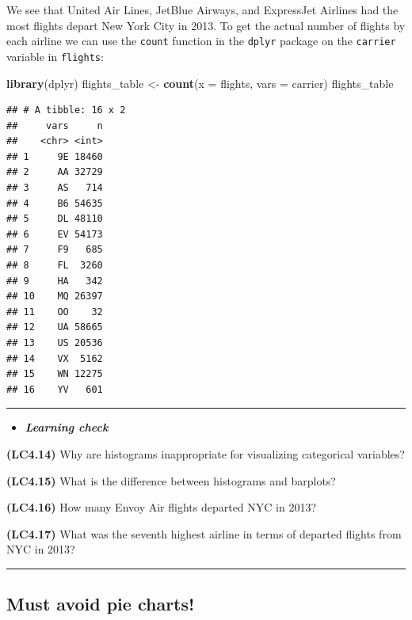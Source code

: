 \documentclass[]{tufte-book}
\newenvironment{Shaded}{\begin{snugshade}}{\end{snugshade}}
\newcommand{\KeywordTok}[1]{\textcolor[rgb]{0.13,0.29,0.53}{\textbf{{#1}}}}
\newcommand{\DataTypeTok}[1]{\textcolor[rgb]{0.13,0.29,0.53}{{#1}}}
\newcommand{\StringTok}[1]{\textcolor[rgb]{0.31,0.60,0.02}{{#1}}}
\newcommand{\NormalTok}[1]{{#1}}
\newenvironment{rmdblock}[1]
  {\begin{shaded*}
  \begin{itemize}
  \renewcommand{\labelitemi}{
    \raisebox{-.7\height}[0pt][0pt]{
    }
  }
  \item
  }
  {
  \end{itemize}
  \end{shaded*}
  }
\newenvironment{learncheck}
  {\begin{rmdblock}{warning}}
  {\end{rmdblock}}
\begin{document}
We see that United Air Lines, JetBlue Airways, and ExpressJet Airlines
had the most flights depart New York City in 2013. To get the actual
number of flights by each airline we can use the \texttt{count} function
in the \texttt{dplyr} package on the \texttt{carrier} variable in
\texttt{flights}:

\begin{Shaded}
\begin{Highlighting}[]
\KeywordTok{library}\NormalTok{(dplyr)}
\NormalTok{flights_table <-}\StringTok{ }\KeywordTok{count}\NormalTok{(}\DataTypeTok{x =} \NormalTok{flights, }\DataTypeTok{vars =} \NormalTok{carrier)}
\NormalTok{flights_table}
\end{Highlighting}
\end{Shaded}

\begin{verbatim}
## # A tibble: 16 x 2
##     vars     n
##    <chr> <int>
## 1     9E 18460
## 2     AA 32729
## 3     AS   714
## 4     B6 54635
## 5     DL 48110
## 6     EV 54173
## 7     F9   685
## 8     FL  3260
## 9     HA   342
## 10    MQ 26397
## 11    OO    32
## 12    UA 58665
## 13    US 20536
## 14    VX  5162
## 15    WN 12275
## 16    YV   601
\end{verbatim}

\begin{center}\rule{\linewidth}{\linethickness}\end{center}

\begin{learncheck}
\textbf{\emph{Learning check}}
\end{learncheck}

\textbf{(LC4.14)} Why are histograms inappropriate for visualizing
categorical variables?

\textbf{(LC4.15)} What is the difference between histograms and
barplots?

\textbf{(LC4.16)} How many Envoy Air flights departed NYC in 2013?

\textbf{(LC4.17)} What was the seventh highest airline in terms of
departed flights from NYC in 2013?

\begin{center}\rule{\linewidth}{\linethickness}\end{center}

\subsection{Must avoid pie charts!}\label{must-avoid-pie-charts}
\end{document}
